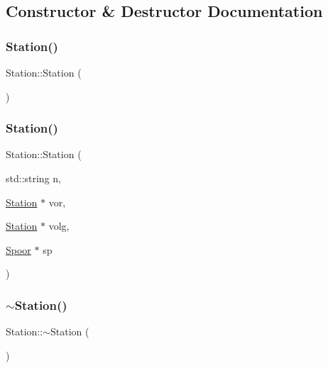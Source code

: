 \subsection{Constructor \& Destructor Documentation}
\mbox{\label{class_station_a73d335726aad1d844d81cda6d9fd74e6}} 
\subsubsection{\texorpdfstring{Station()}{Station()}\hspace{0.1cm}{\footnotesize\ttfamily [1/2]}}
{\footnotesize\ttfamily Station\+::\+Station (\begin{DoxyParamCaption}{ }\end{DoxyParamCaption})}

\mbox{\label{class_station_a1685ff9a628b922fbc6a75f0f23c7b7e}} 
\subsubsection{\texorpdfstring{Station()}{Station()}\hspace{0.1cm}{\footnotesize\ttfamily [2/2]}}
{\footnotesize\ttfamily Station\+::\+Station (\begin{DoxyParamCaption}\item[{std\+::string}]{n,  }\item[{\hyperlink{class_station}{Station} $\ast$}]{vor,  }\item[{\hyperlink{class_station}{Station} $\ast$}]{volg,  }\item[{\hyperlink{class_spoor}{Spoor} $\ast$}]{sp }\end{DoxyParamCaption})}

\mbox{\label{class_station_a00434e79e8ee7f4ebd6d3b631dde5ac0}} 
\subsubsection{\texorpdfstring{$\sim$\+Station()}{~Station()}}
{\footnotesize\ttfamily Station\+::$\sim$\+Station (\begin{DoxyParamCaption}{ }\end{DoxyParamCaption})\hspace{0.3cm}{\ttfamily [virtual]}}



